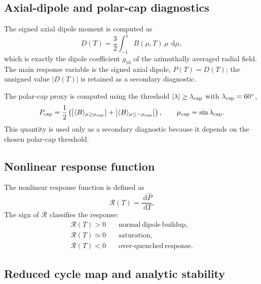 \documentclass[namedreferences,hyperref,optionalrh,solaromanenum]{spr-sola}
\newcommand{\rmd}{{\ \mathrm d}}
\begin{document}
\subsection{Axial-dipole and polar-cap diagnostics}
\label{subsec:diagnostics}

The signed axial dipole moment is computed as
%
\begin{equation}
D(T)
=
\frac{3}{2}
\int_{-1}^{1}
B(\mu,T)\,\mu\,\rmd\mu,
\label{eq:axial_dipole_mu}
\end{equation}
%
which is exactly the dipole coefficient $g_{10}$ of the azimuthally
averaged radial field. The main response variable is the signed axial
dipole, $P(T)=D(T)$; the unsigned value $|D(T)|$ is retained as a
secondary diagnostic.

The polar-cap proxy is computed using the threshold
$|\lambda|\ge\lambda_{\rm cap}$ with $\lambda_{\rm cap}=60^\circ$,
%
\begin{equation}
P_{\rm cap}
=
\frac{1}{2}
\left(
\left|
\langle B\rangle_{\mu\ge\mu_{\rm cap}}
\right|
+
\left|
\langle B\rangle_{\mu\le-\mu_{\rm cap}}
\right|
\right),
\qquad
\mu_{\rm cap}=\sin\lambda_{\rm cap}.
\label{eq:polar_cap_proxy}
\end{equation}
%
This quantity is used only as a secondary diagnostic because it depends on
the chosen polar-cap threshold.

\subsection{Nonlinear response function}
\label{subsec:response_function_equation}

The nonlinear response function is defined as
%
\begin{equation}
\mathcal{R}(T)
=
\frac{\rmd\hat{P}}{\rmd T}.
\label{eq:R_def}
\end{equation}
%
The sign of $\mathcal{R}$ classifies the response:
%
\begin{align}
\mathcal{R}(T)>0
&\quad \mathrm{normal~dipole~buildup},\\
\mathcal{R}(T)\simeq0
&\quad \mathrm{saturation},\\
\mathcal{R}(T)<0
&\quad \mathrm{over\text{-}quenched~response}.
\end{align}

\subsection{Reduced cycle map and analytic stability}
\label{subsec:cycle_map_stability}
\end{document}
